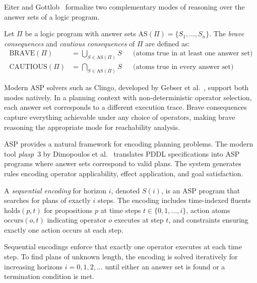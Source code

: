 Eiter and Gottlob~\cite{Eiter1995} formalize two complementary modes of reasoning over the answer sets of a logic program.

\begin{defn}
    \label{defn:brave_cautious}
    Let $\Pi$ be a logic program with answer sets $\text{AS}(\Pi) = \{S_1, \ldots, S_n\}$. The \emph{brave consequences} and \emph{cautious consequences} of $\Pi$ are defined as:
    \begin{align*}
        \text{BRAVE}(\Pi)    & = \bigcup_{S \in \text{AS}(\Pi)} S &  & \text{(atoms true in at least one answer set)} \\
        \text{CAUTIOUS}(\Pi) & = \bigcap_{S \in \text{AS}(\Pi)} S &  & \text{(atoms true in every answer set)}
    \end{align*}
\end{defn}

Modern \ac{ASP} solvers such as Clingo, developed by Gebser et al.~\cite{Gebser2012}, support both modes natively. In a planning context with non-deterministic operator selection, each answer set corresponds to a different execution trace. Brave consequences capture everything achievable under any choice of operators, making brave reasoning the appropriate mode for reachability analysis.

\ac{ASP} provides a natural framework for encoding planning problems. The modern tool \textit{plasp}~3 by Dimopoulos et al.~\cite{Dimopoulos2019} translates \ac{PDDL} specifications into \ac{ASP} programs where answer sets correspond to valid plans. The system generates rules encoding operator applicability, effect application, and goal satisfaction.

\begin{defn}
    \label{defn:sequential_encoding}
    A \emph{sequential encoding} for horizon $i$, denoted $S(i)$, is an \ac{ASP} program that searches for plans of exactly $i$ steps. The encoding includes time-indexed fluents $\text{holds}(p, t)$ for propositions $p$ at time steps $t \in \{0, 1, \ldots, i\}$, action atoms $\text{occurs}(o, t)$ indicating operator $o$ executes at step $t$, and constraints ensuring exactly one action occurs at each step.
\end{defn}

Sequential encodings enforce that exactly one operator executes at each time step. To find plans of unknown length, the encoding is solved iteratively for increasing horizons $i = 0, 1, 2, \ldots$ until either an answer set is found or a termination condition is met.


